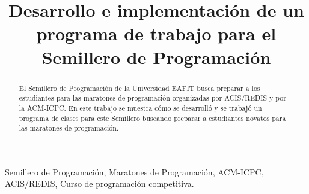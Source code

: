 \documentclass[conference]{IEEEtran}
\begin{document}
%
\title{Desarrollo e implementación de un programa de trabajo para el Semillero de Programación}


\author{
\and
{}
}


\maketitle


\begin{abstract}
El Semillero de Programación de la Universidad EAFIT busca preparar a los estudiantes para las maratones de programación organizadas por ACIS/REDIS y por la ACM-ICPC. En este trabajo se muestra cómo se desarrolló y se trabajó un programa de clases para este Semillero buscando preparar a estudiantes novatos para las maratones de programación. 
\end{abstract}

\begin{keywords}
Semillero de Programación, Maratones de Programación, ACM-ICPC, ACIS/REDIS, Curso de programación competitiva.
\end{keywords}
\end{document}
